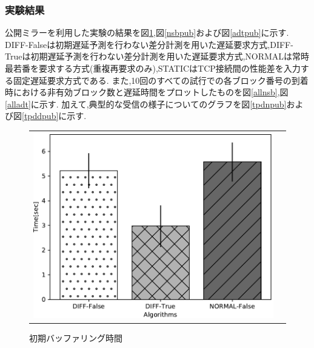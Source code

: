 \documentclass[a4j,12pt]{gradthesis_utf8}
\begin{document}
\subsubsection{実験結果}
公開ミラーを利用した実験の結果を図\ref{ibtpub},図\ref{nsbpub}および図\ref{adtpub}に示す.
DIFF-Falseは初期遅延予測を行わない差分計測を用いた遅延要求方式,DIFF-Trueは初期遅延予測を行わない差分計測を用いた遅延要求方式,NORMALは常時最若番を要求する方式(重複再要求のみ),STATICはTCP接続間の性能差を入力する固定遅延要求方式である.
また,10回のすべての試行での各ブロック番号の到着時における非有効ブロック数と遅延時間をプロットしたものを図\ref{allnsb},図\ref{alladt}に示す.
加えて,典型的な受信の様子についてのグラフを図\ref{tpdnpub}および図\ref{tpddpub}に示す.
\begin{figure}[h]
    \begin{tabular}{cc}
       	\begin{minipage}[t]{0.9\hsize}
       		\centering
       		\includegraphics[width=13cm]{figure/InitialBufferingTimePub.pdf}
       		\caption{初期バッファリング時間}
       		\label{ibtpub}
       	\end{minipage}
    \end{tabular}
\end{figure}
\end{document}
